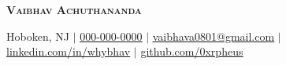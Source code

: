 \begin{center}

    \textbf{\Huge \scshape Vaibhav Achuthananda} \\ \vspace{1pt}
    
    \small Hoboken, NJ $|$
    \href{tel:+1-000-000-0000}{\underline{000-000-0000}} $|$
    \href{mailto:vaibhava0801@gmail.com}{\underline{vaibhava0801@gmail.com}} $|$
    \href{https://linkedin.com/in/whybhav}{\underline{linkedin.com/in/whybhav}} $|$
    \href{https://github.com/0xrpheus}{\underline{github.com/0xrpheus}}
    
\end{center}